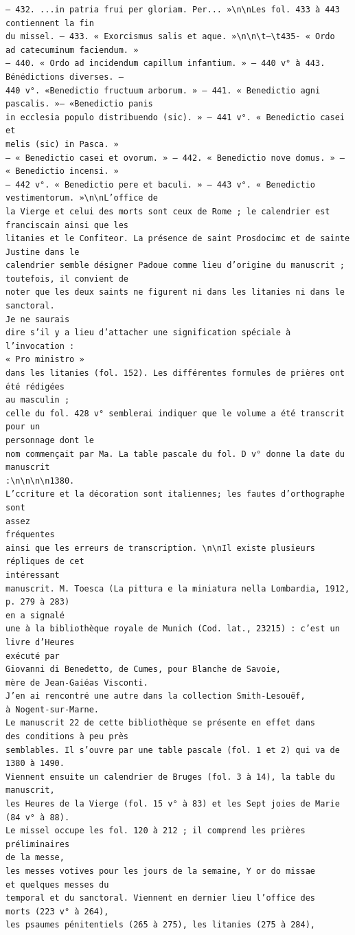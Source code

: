 \documentclass[a4paper,12pt,twoside]{book}
\begin{document}
\begin{verbatim}
— 432. ...in patria frui per gloriam. Per... »\n\nLes fol. 433 à 443 
contiennent la fin 
du missel. — 433. « Exorcismus salis et aque. »\n\n\t—\t435- « Ordo
ad catecuminum faciendum. »
— 440. « Ordo ad incidendum capillum infantium. » — 440 v° à 443. 
Bénédictions diverses. —
440 v°. «Benedictio fructuum arborum. » — 441. « Benedictio agni
pascalis. »— «Benedictio panis
in ecclesia populo distribuendo (sic). » — 441 v°. « Benedictio casei et
melis (sic) in Pasca. »
— « Benedictio casei et ovorum. » — 442. « Benedictio nove domus. » — 
« Benedictio incensi. » 
— 442 v°. « Benedictio pere et baculi. » — 443 v°. « Benedictio
vestimentorum. »\n\nL’office de
la Vierge et celui des morts sont ceux de Rome ; le calendrier est 
franciscain ainsi que les 
litanies et le Confiteor. La présence de saint Prosdocimc et de sainte 
Justine dans le 
calendrier semble désigner Padoue comme lieu d’origine du manuscrit ; 
toutefois, il convient de 
noter que les deux saints ne figurent ni dans les litanies ni dans le sanctoral. 
Je ne saurais 
dire s’il y a lieu d’attacher une signification spéciale à l’invocation : 
« Pro ministro » 
dans les litanies (fol. 152). Les différentes formules de prières ont été rédigées 
au masculin ;
celle du fol. 428 v° semblerai indiquer que le volume a été transcrit pour un 
personnage dont le
nom commençait par Ma. La table pascale du fol. D v° donne la date du manuscrit
:\n\n\n\n1380.
L’ccriture et la décoration sont italiennes; les fautes d’orthographe sont
assez 
fréquentes
ainsi que les erreurs de transcription. \n\nIl existe plusieurs répliques de cet
intéressant
manuscrit. M. Toesca (La pittura e la miniatura nella Lombardia, 1912, p. 279 à 283) 
en a signalé
une à la bibliothèque royale de Munich (Cod. lat., 23215) : c’est un livre d’Heures 
exécuté par 
Giovanni di Benedetto, de Cumes, pour Blanche de Savoie, 
mère de Jean-Gaiéas Visconti. 
J’en ai rencontré une autre dans la collection Smith-Lesouëf, 
à Nogent-sur-Marne. 
Le manuscrit 22 de cette bibliothèque se présente en effet dans 
des conditions à peu près 
semblables. Il s’ouvre par une table pascale (fol. 1 et 2) qui va de 1380 à 1490. 
Viennent ensuite un calendrier de Bruges (fol. 3 à 14), la table du manuscrit,
les Heures de la Vierge (fol. 15 v° à 83) et les Sept joies de Marie (84 v° à 88).
Le missel occupe les fol. 120 à 212 ; il comprend les prières préliminaires 
de la messe,
les messes votives pour les jours de la semaine, Y or do missae 
et quelques messes du
temporal et du sanctoral. Viennent en dernier lieu l’office des 
morts (223 v° à 264), 
les psaumes pénitentiels (265 à 275), les litanies (275 à 284), 

\end{verbatim}
\end{document}
